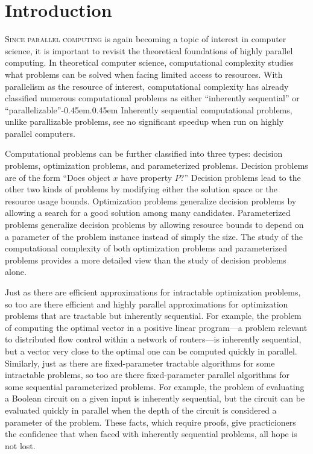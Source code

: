 \chapter{Introduction}

%
%
%
\lettrine{S}{ince parallel computing} is again becoming a topic of interest in computer science, it is important to revisit the theoretical foundations of highly parallel computing.
In theoretical computer science, computational complexity studies what problems can be solved when facing limited access to resources.
With parallelism as the resource of interest, computational complexity has already classified numerous computational problems as either ``inherently sequential'' or ``parallelizable''\kern-0.45em.\kern0.45em
Inherently sequential computational problems, unlike parallizable problems, see no significant speedup when run on highly parallel computers.

Computational problems can be further classified into three types: decision problems, optimization problems, and parameterized problems.
Decision problems are of the form ``Does object $x$ have property $P$?''
Decision problems lead to the other two kinds of problems by modifying either the solution space or the resource usage bounds.
Optimization problems generalize decision problems by allowing a search for a good solution among many candidates.
Parameterized problems generalize decision problems by allowing resource bounds to depend on a parameter of the problem instance instead of simply the size.
The study of the computational complexity of both optimization problems and parameterized problems provides a more detailed view than the study of decision problems alone.

%
%
%
Just as there are efficient approximations for intractable optimization problems, so too are there efficient and highly parallel approximations for optimization problems that are tractable but inherently sequential.
For example, the problem of computing the optimal vector in a positive linear program---a problem relevant to distributed flow control within a network of routers---is inherently sequential, but a vector very close to the optimal one can be computed quickly in parallel.
Similarly, just as there are fixed-parameter tractable algorithms for some intractable problems, so too are there fixed-parameter parallel algorithms for some sequential parameterized problems.
For example, the problem of evaluating a Boolean circuit on a given input is inherently sequential, but the circuit can be evaluated quickly in parallel when the depth of the circuit is considered a parameter of the problem.
These facts, which require proofs, give practicioners the confidence that when faced with inherently sequential problems, all hope is not lost.


